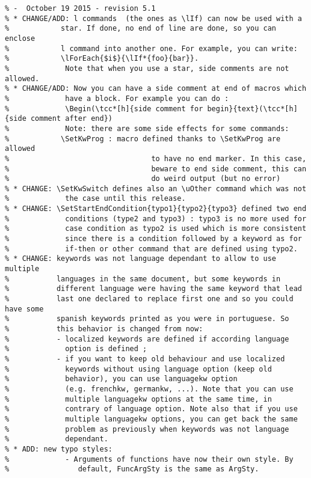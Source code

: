\documentclass[a4paper]{article}
\begin{document}
\begin{verbatim}
% -  October 19 2015 - revision 5.1
% * CHANGE/ADD: l commands  (the ones as \lIf) can now be used with a
%            star. If done, no end of line are done, so you can enclose
%            l command into another one. For example, you can write:
%            \lForEach{$i$}{\lIf*{foo}{bar}}.
%             Note that when you use a star, side comments are not allowed.
% * CHANGE/ADD: Now you can have a side comment at end of macros which
%             have a block. For example you can do : 
%             \Begin(\tcc*[h]{side comment for begin}{text}(\tcc*[h]{side comment after end})
%             Note: there are some side effects for some commands:
%            \SetKwProg : macro defined thanks to \SetKwProg are allowed
%                                 to have no end marker. In this case,
%                                 beware to end side comment, this can
%                                 do weird output (but no error)
% * CHANGE: \SetKwSwitch defines also an \uOther command which was not
%             the case until this release.
% * CHANGE: \SetStartEndCondition{typo1}{typo2}{typo3} defined two end
%             conditions (type2 and typo3) : typo3 is no more used for
%             case condition as typo2 is used which is more consistent
%             since there is a condition followed by a keyword as for
%             if-then or other command that are defined using typo2.
% * CHANGE: keywords was not language dependant to allow to use multiple
%           languages in the same document, but some keywords in
%           different language were having the same keyword that lead
%           last one declared to replace first one and so you could have some
%           spanish keywords printed as you were in portuguese. So
%           this behavior is changed from now:
%           - localized keywords are defined if according language
%             option is defined ; 
%           - if you want to keep old behaviour and use localized
%             keywords without using language option (keep old
%             behavior), you can use languagekw option
%             (e.g. frenchkw, germankw, ...). Note that you can use
%             multiple languagekw options at the same time, in
%             contrary of language option. Note also that if you use
%             multiple languagekw options, you can get back the same
%             problem as previously when keywords was not language
%             dependant.
% * ADD: new typo styles:
%             - Arguments of functions have now their own style. By
%                default, FuncArgSty is the same as ArgSty. 

\end{verbatim}
\end{document}
